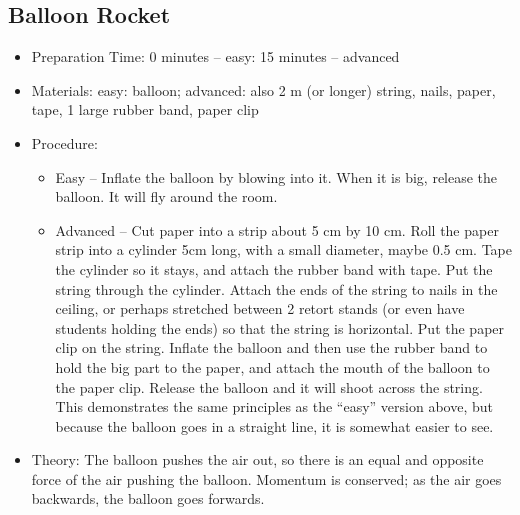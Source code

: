 \subsection{Balloon Rocket}
\begin{itemize}
\item{Preparation Time: 0 minutes – easy: 15 minutes – advanced}
\item{Materials: easy: balloon; advanced: also 2 m (or longer) string, nails, paper, tape, 1 large rubber band, paper clip}
\item{Procedure:
\begin{itemize}
\item{Easy – Inflate the balloon by blowing into it. When it is big, release the balloon. It will fly around the room.}
\item{Advanced – Cut paper into a strip about 5 cm by 10 cm. Roll the paper strip into a cylinder 5cm long, with a small diameter, maybe 0.5 cm. Tape the cylinder so it stays, and attach the rubber band with tape. Put the string through the cylinder. Attach the ends of the string to nails in the ceiling, or perhaps stretched between 2 retort stands (or even have students holding the ends) so that the string is horizontal. Put the paper clip on the string. Inflate the balloon and then use the rubber band to hold the big part to the paper, and attach the mouth of the balloon to the paper clip. Release the balloon and it will shoot across the string. This demonstrates the same principles as the “easy” version above, but because the balloon goes in a straight line, it is somewhat easier to see.}
\end{itemize}
} %
\item{Theory: The balloon pushes the air out, so there is an equal and opposite force of the air pushing the balloon. Momentum is conserved; as the air goes backwards, the balloon goes forwards.}
\end{itemize}

